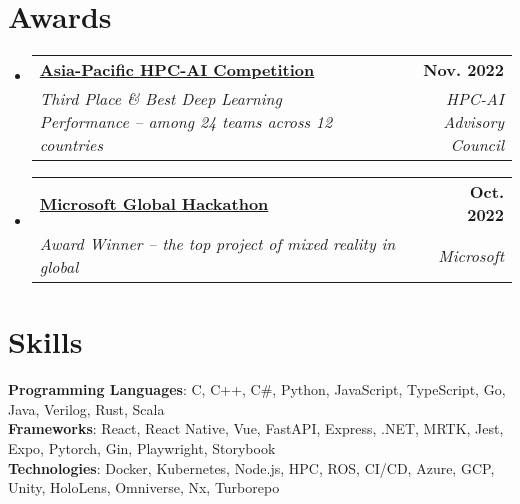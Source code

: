 \documentclass[letterpaper,11pt]{article}
\makeatletter
\newcommand{\resumeSubheading}[4]{
  \vspace{-2pt}\item
    \begin{tabular*}{1.0\textwidth}[t]{l@{\extracolsep{\fill}}r}
      \textbf{#1} & \textbf{\small #2} \\
      \textit{\small#3} & \textit{\small #4} \\
    \end{tabular*}\vspace{-7pt}
}
\newcommand{\resumeSubHeadingListStart}{\begin{itemize}[leftmargin=0.0in, label={}]}
\newcommand{\resumeSubHeadingListEnd}{\end{itemize}}
\makeatother
\begin{document}
\section{Awards}
    \resumeSubHeadingListStart
        \resumeSubheading{\href{https://nci.org.au/news-events/news/growing-skills-hpc-researchers-through-regional-competition}{Asia-Pacific HPC-AI Competition}}{Nov. 2022}{Third Place \& Best Deep Learning Performance -- among 24 teams across 12 countries}{HPC-AI Advisory Council}
        \resumeSubheading{\href{https://news.microsoft.com/zh-tw/features/microsoft-hackathon-2022/}{Microsoft Global Hackathon}}{Oct. 2022}{Award Winner -- the top project of mixed reality in global}{Microsoft}
    \resumeSubHeadingListEnd
\vspace{-12pt}

\section{Skills}
 \begin{itemize}[leftmargin=0.0in, label={}]
    \small{\item{
     \textbf{Programming Languages}{: C, C++, C\#, Python, JavaScript, TypeScript, Go, Java, Verilog, Rust, Scala} \\
     \textbf{Frameworks}{: React, React Native, Vue, FastAPI, Express, .NET, MRTK, Jest, Expo, Pytorch, Gin, Playwright, Storybook} \\
     \textbf{Technologies}{: Docker, Kubernetes, Node.js, HPC, ROS, CI/CD, Azure, GCP, Unity, HoloLens, Omniverse, Nx, Turborepo} \\
    }}
 \end{itemize}
 \vspace{-16pt}
\end{document}
